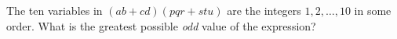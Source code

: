 The ten variables in $(ab+cd)(pqr+stu)$ are the integers $1,2,\dots,10$ in some order. What is the greatest possible \emph{odd} value of the expression?
